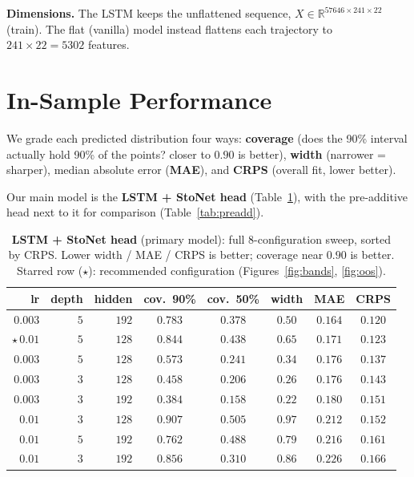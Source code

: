 \documentclass[11pt]{article}
\begin{document}
\medskip
\noindent
\textbf{Dimensions.} The LSTM keeps the unflattened sequence,
$X\in\mathbb{R}^{57646\times 241\times 22}$ (train). The flat (vanilla) model
instead flattens each trajectory to $241\times 22 = 5302$ features.

\section{In-Sample Performance}
\label{sec:insample}

We grade each predicted distribution four ways: \textbf{coverage} (does the 90\%
interval actually hold 90\% of the points? closer to $0.90$ is better), \textbf{width}
(narrower = sharper), median absolute error (\textbf{MAE}), and \textbf{CRPS} (overall
fit, lower better).

Our main model is the \textbf{LSTM + StoNet head} (Table~\ref{tab:stonet}), with the
pre-additive head next to it for comparison (Table~\ref{tab:preadd}).

\begin{table}[h]
  \centering
  \caption{\textbf{LSTM + StoNet head} (primary model): full $8$-configuration
  sweep, sorted by CRPS. Lower width / MAE / CRPS is better; coverage near $0.90$ is
  better. Starred row ($\star$): recommended configuration (Figures~\ref{fig:bands},
  \ref{fig:oos}).}
  \label{tab:stonet}
  \begin{tabular}{rrr ccccc}
    \toprule
    lr & depth & hidden & cov.\ 90\% & cov.\ 50\% & width & MAE & CRPS \\
    \midrule
    $0.003$ & $5$ & $192$ & $0.783$ & $0.378$ & $0.50$ & $0.164$ & $0.120$ \\
    $\star$\,$0.01$ & $5$ & $128$ & $\mathbf{0.844}$ & $\mathbf{0.438}$ & $\mathbf{0.65}$ & $\mathbf{0.171}$ & $\mathbf{0.123}$ \\
    $0.003$ & $5$ & $128$ & $0.573$ & $0.241$ & $0.34$ & $0.176$ & $0.137$ \\
    $0.003$ & $3$ & $128$ & $0.458$ & $0.206$ & $0.26$ & $0.176$ & $0.143$ \\
    $0.003$ & $3$ & $192$ & $0.384$ & $0.158$ & $0.22$ & $0.180$ & $0.151$ \\
    $0.01$  & $3$ & $128$ & $0.907$ & $0.505$ & $0.97$ & $0.212$ & $0.152$ \\
    $0.01$  & $5$ & $192$ & $0.762$ & $0.488$ & $0.79$ & $0.216$ & $0.161$ \\
    $0.01$  & $3$ & $192$ & $0.856$ & $0.310$ & $0.86$ & $0.226$ & $0.166$ \\
    \bottomrule
  \end{tabular}
\end{table}
\end{document}
